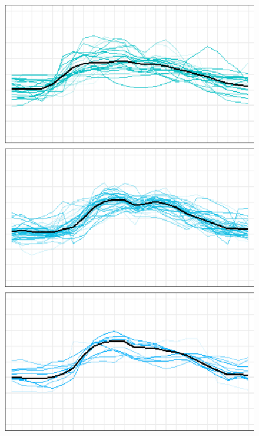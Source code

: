 \documentclass[
	11pt, %
	aspectratio=169, %
]{beamer}
\begin{document}
\begin{frame}
\begin{figure}
\begin{minipage}{0.16\textwidth}
			\includegraphics[width=\linewidth,keepaspectratio]{load_profile_4.png}
		\end{minipage}
		\begin{minipage}{0.16\textwidth}

\end{minipage}
\end{figure}
\end{frame}
\end{document}
